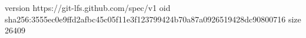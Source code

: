 version https://git-lfs.github.com/spec/v1
oid sha256:3555ec0e9ffd2afbc45c05f11e3f123799424b70a87a0926519428dc90800716
size 26409
